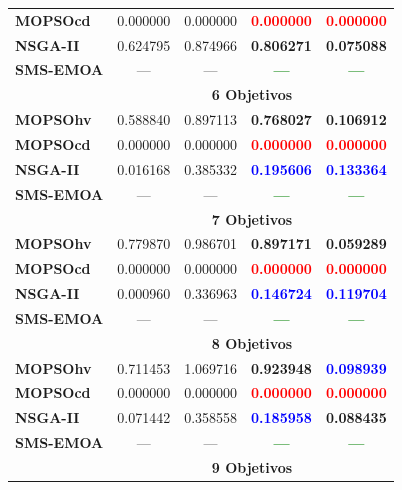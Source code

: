 \begin{longtable}{|l|cc|cc|}
	\textbf{MOPSOcd} &0.000000 & 0.000000 & \textbf{\textcolor{red}{0.000000}} & \textbf{\textcolor{red}{0.000000}} \\ 
	\textbf{NSGA-II} &0.624795 & 0.874966 & \textbf{0.806271} & \textbf{0.075088}\\  
	\textbf{SMS-EMOA}& --- & --- & \textbf{\textcolor{green}{---}} & \textbf{\textcolor{green}{---}} \\
	\hline\hline
& \multicolumn{4}{|c|}{\textbf{6 Objetivos}} \\ 
	\hline\hline
	\textbf{MOPSOhv} &0.588840 & 0.897113 & \textbf{0.768027} & \textbf{0.106912} \\ 
	\textbf{MOPSOcd} &0.000000 & 0.000000 & \textbf{\textcolor{red}{0.000000}} & \textbf{\textcolor{red}{0.000000}} \\ 
	\textbf{NSGA-II} &0.016168 & 0.385332 & \textbf{\textcolor{blue}{0.195606}} & \textbf{\textcolor{blue}{0.133364}} \\  
	\textbf{SMS-EMOA}& --- & --- & \textbf{\textcolor{green}{---}} &\textbf{\textcolor{green}{ --- }}\\
	\hline\hline
 & \multicolumn{4}{|c|}{\textbf{7 Objetivos}} \\ 
	\hline\hline
	\textbf{MOPSOhv} &0.779870 & 0.986701 & \textbf{0.897171} & \textbf{0.059289} \\ 
	\textbf{MOPSOcd} &0.000000 & 0.000000 & \textbf{\textcolor{red}{0.000000}} & \textbf{\textcolor{red}{0.000000}} \\ 
	\textbf{NSGA-II} &0.000960 & 0.336963 & \textbf{\textcolor{blue}{0.146724}} & \textbf{\textcolor{blue}{0.119704}} \\  
	\textbf{SMS-EMOA} & --- & --- & \textbf{\textcolor{green}{---}} & \textbf{\textcolor{green}{---}} \\
	\hline\hline
 & \multicolumn{4}{|c|}{\textbf{8 Objetivos}} \\ 
	\hline\hline
	\textbf{MOPSOhv} &0.711453 & 1.069716 & \textbf{0.923948} & \textbf{\textcolor{blue}{0.098939}} \\ 
	\textbf{MOPSOcd} &0.000000 & 0.000000 & \textbf{\textcolor{red}{0.000000}} & \textbf{\textcolor{red}{0.000000}} \\ 
	\textbf{NSGA-II} &0.071442 & 0.358558 & \textbf{\textcolor{blue}{0.185958}} & \textbf{0.088435}\\ 
	\textbf{SMS-EMOA} & --- & --- & \textbf{\textcolor{green}{---}} & \textbf{\textcolor{green}{---}} \\
	\hline\hline
 & \multicolumn{4}{|c|}{\textbf{9 Objetivos}} \\ 

\end{longtable}
